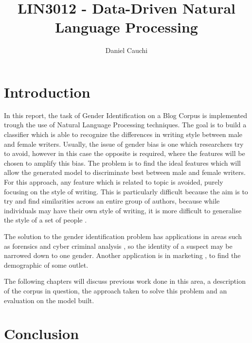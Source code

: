 \documentclass{article}
\begin{document}
\title{LIN3012 - Data-Driven Natural Language Processing}
\author{Daniel Cauchi}
\date{}
\maketitle


\section{Introduction}
In this report, the task of Gender Identification on a Blog Corpus is implemented trough the use of Natural Language Processing techniques. The goal is to build a classifier which is able to recognize the differences in writing style between male and female writers. Usually, the issue of gender bias is one which researchers try to avoid, however in this case the opposite is required, where the features will be chosen to amplify this bias. The problem is to find the ideal features which will allow the generated model to discriminate best between male and female writers. For this approach, any feature which is related to topic is avoided, purely focusing on the style of writing. This is particularly difficult because the aim is to try and find similarities across an entire group of authors, because while individuals may have their own style of writing, it is more difficult to generalise the style of a set of people \cite{3}.


The solution to the gender identification problem has applications in areas such as forensics \cite{2, 6} and cyber criminal analysis \cite{1}, so the identity of a suspect may be narrowed down to one gender. Another application is in marketing \cite{6}, to find the demographic of some outlet.

The following chapters will discuss previous work done in this area, a description of the corpus in question, the approach taken to solve this problem and an evaluation on the model built.





\section{Conclusion}

\pagebreak




\pagebreak


\end{document}
